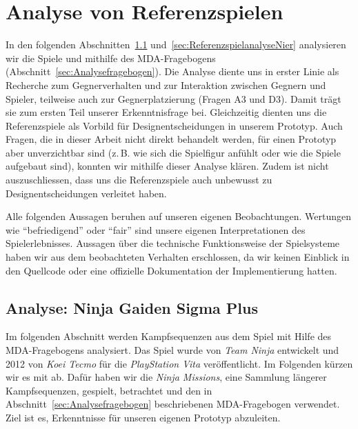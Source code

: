 \documentclass[../Main.tex]{subfiles}
\begin{document}
\section{Analyse von Referenzspielen} \label{sec:Referenzspielanalyse}

In den folgenden Abschnitten~\ref{sec:ReferenzspielanalyseNinja} und~\ref{sec:ReferenzspielanalyseNier} analysieren wir die Spiele  und  mithilfe des MDA-Fragebogens (Abschnitt~\ref{sec:Analysefragebogen}). Die Analyse diente uns in erster Linie als Recherche zum Gegnerverhalten und zur Interaktion zwischen Gegnern und Spieler, teilweise auch zur Gegnerplatzierung (Fragen A3 und D3). Damit trägt sie zum ersten Teil unserer Erkenntnisfrage bei. Gleichzeitig dienten uns die Referenzspiele als Vorbild für Designentscheidungen in unserem Prototyp. Auch Fragen, die in dieser Arbeit nicht direkt behandelt werden, für einen Prototyp aber unverzichtbar sind (z.\,B. wie sich die Spielfigur anfühlt oder wie die Spiele aufgebaut sind), konnten wir mithilfe dieser Analyse klären. Zudem ist nicht auszuschliessen, dass uns die Referenzspiele auch unbewusst zu Designentscheidungen verleitet haben.

Alle folgenden Aussagen beruhen auf unseren eigenen Beobachtungen. Wertungen wie \enquote{befriedigend} oder \enquote{fair} sind unsere eigenen Interpretationen des Spielerlebnisses. Aussagen über die technische Funktionsweise der Spielsysteme haben wir aus dem beobachteten Verhalten erschlossen, da wir keinen Einblick in den Quellcode oder eine offizielle Dokumentation der Implementierung hatten.

\subsection{Analyse: Ninja Gaiden Sigma Plus} \label{sec:ReferenzspielanalyseNinja}

Im folgenden Abschnitt werden Kampfsequenzen aus dem Spiel  mit Hilfe des MDA-Fragebogens analysiert. Das Spiel wurde von \textit{Team Ninja} entwickelt und 2012 von \textit{Koei Tecmo} für die \textit{PlayStation Vita} veröffentlicht.\autocite{koeitechmo_ninjagaiden_2012} Im Folgenden kürzen wir es mit  ab. Dafür haben wir die \textit{Ninja Missions}, eine Sammlung längerer Kampfsequenzen, gespielt, betrachtet und den in Abschnitt~\ref{sec:Analysefragebogen} beschriebenen MDA-Fragebogen verwendet. Ziel ist es, Erkenntnisse für unseren eigenen Prototyp abzuleiten.
\end{document}
